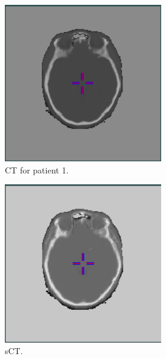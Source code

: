\begin{figure}
    \centering
    \begin{subfigure}[b]{0.3\textwidth}
        \centering
        \includegraphics[width=0.75\textwidth]{colager/loocv_ct/loocv_010476_ct.png}
        \caption{CT for patient 1.}
        \label{col:loocv_ct_pat1_ct}
    \end{subfigure}\hfill
    \begin{subfigure}[b]{0.3\textwidth}
        \centering
        \includegraphics[width=0.75\textwidth]{colager/loocv_ct/loocv_010476_sct.png}
        \caption{sCT.}
        \label{col:loocv_ct_pat1_sct}
    \end{subfigure}\hfill
    \begin{subfigure}[b]{0.3\textwidth}

\end{subfigure}
\end{figure}
